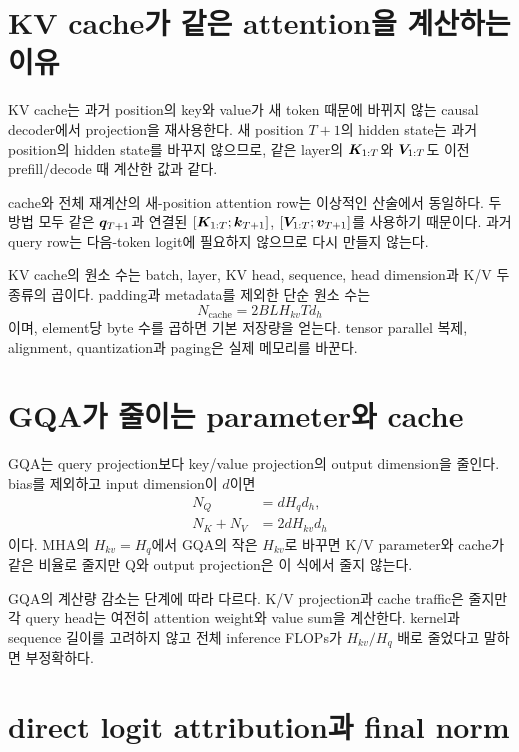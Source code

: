 \section{KV cache가 같은 attention을 계산하는 이유}

KV cache는 과거 position의 key와 value가 새 token 때문에 바뀌지 않는 causal decoder에서 projection을 재사용한다.
새 position $T+1$의 hidden state는 과거 position의 hidden state를 바꾸지 않으므로, 같은 layer의 $\bm{K}_{1:T}$와 $\bm{V}_{1:T}$도 이전 prefill/decode 때 계산한 값과 같다.

cache와 전체 재계산의 새-position attention row는 이상적인 산술에서 동일하다.
두 방법 모두 같은 $\bm{q}_{T+1}$과 연결된 $[\bm{K}_{1:T};\bm{k}_{T+1}]$, $[\bm{V}_{1:T};\bm{v}_{T+1}]$를 사용하기 때문이다.
과거 query row는 다음-token logit에 필요하지 않으므로 다시 만들지 않는다.

KV cache의 원소 수는 batch, layer, KV head, sequence, head dimension과 K/V 두 종류의 곱이다.
padding과 metadata를 제외한 단순 원소 수는
\begin{equation}
  N_{\mathrm{cache}}=2BLH_{kv}Td_h
\end{equation}
이며, element당 byte 수를 곱하면 기본 저장량을 얻는다.
tensor parallel 복제, alignment, quantization과 paging은 실제 메모리를 바꾼다.

\section{GQA가 줄이는 parameter와 cache}

GQA는 query projection보다 key/value projection의 output dimension을 줄인다.
bias를 제외하고 input dimension이 $d$이면
\begin{align}
  N_Q&=dH_qd_h,\\
  N_K+N_V&=2dH_{kv}d_h
\end{align}
이다.
MHA의 $H_{kv}=H_q$에서 GQA의 작은 $H_{kv}$로 바꾸면 K/V parameter와 cache가 같은 비율로 줄지만 Q와 output projection은 이 식에서 줄지 않는다.

GQA의 계산량 감소는 단계에 따라 다르다.
K/V projection과 cache traffic은 줄지만 각 query head는 여전히 attention weight와 value sum을 계산한다.
kernel과 sequence 길이를 고려하지 않고 전체 inference FLOPs가 $H_{kv}/H_q$ 배로 줄었다고 말하면 부정확하다.

\section{direct logit attribution과 final norm}

